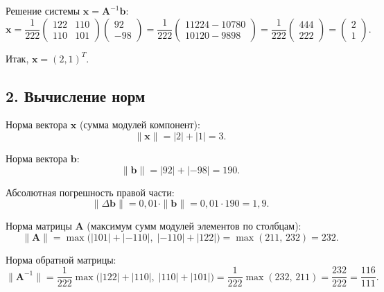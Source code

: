 \documentclass{article}
\begin{document}
Решение системы $\mathbf{x} = \mathbf{A}^{-1}\mathbf{b}$:
\begin{equation}
\mathbf{x} = \frac{1}{222} \begin{pmatrix} 122 & 110 \\ 110 & 101 \end{pmatrix} \begin{pmatrix} 92 \\ -98 \end{pmatrix} = \frac{1}{222} \begin{pmatrix} 11224 - 10780 \\ 10120 - 9898 \end{pmatrix} = \frac{1}{222} \begin{pmatrix} 444 \\ 222 \end{pmatrix} = \begin{pmatrix} 2 \\ 1 \end{pmatrix}.
\end{equation}

Итак, $\mathbf{x} = (2, 1)^T$.

\subsection*{2. Вычисление норм}

Норма вектора $\mathbf{x}$ (сумма модулей компонент):
\begin{equation}
\|\mathbf{x}\| = |2| + |1| = 3.
\end{equation}

Норма вектора $\mathbf{b}$:
\begin{equation}
\|\mathbf{b}\| = |92| + |-98| = 190.
\end{equation}

Абсолютная погрешность правой части:
\begin{equation}
\|\Delta\mathbf{b}\| = 0{,}01 \cdot \|\mathbf{b}\| = 0{,}01 \cdot 190 = 1{,}9.
\end{equation}

Норма матрицы $\mathbf{A}$ (максимум сумм модулей элементов по столбцам):
\begin{equation}
\|\mathbf{A}\| = \max\bigl(|101| + |-110|,\; |-110| + |122|\bigr) = \max(211,\, 232) = 232.
\end{equation}

Норма обратной матрицы:
\begin{equation}
\|\mathbf{A}^{-1}\| = \frac{1}{222} \max\bigl(|122| + |110|,\; |110| + |101|\bigr) = \frac{1}{222} \max(232,\, 211) = \frac{232}{222} = \frac{116}{111}.
\end{equation}
\end{document}
